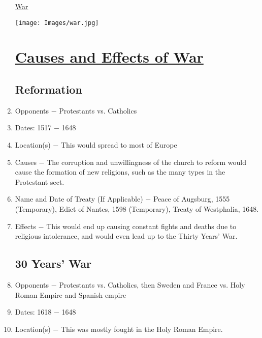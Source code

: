 \documentclass[12pt]{article}
\begin{document}
\begin{enumerate}
\newpage
\begin{center}
\end{center}
\begin{center}
\end{center}
\begin{center}
\underline{\Huge War}
\end{center}
\vspace{50pt}
\texttt{[image: Images/war.jpg]}
\newpage

\section{\underline{Causes and Effects of War}}

\subsection{Reformation} 

\item Opponents $-$ Protestants vs. Catholics

\item Dates: 1517 $-$ 1648

\item Location(s) $-$ This would spread to most of Europe

\item Causes $-$ The corruption and unwillingness of the church to reform would cause the formation of new religions, such as the many types in the Protestant sect.

\item Name and Date of Treaty (If Applicable) $-$ Peace of Augsburg, 1555 (Temporary), Edict of Nantes, 1598 (Temporary), Treaty of Westphalia, 1648.

\item Effects $-$ This would end up causing constant fights and deaths due to religious intolerance, and would even lead up to the Thirty Years' War.

\subsection{30 Years' War}

\item Opponents $-$ Protestants vs. Catholics, then Sweden and France vs. Holy Roman Empire and Spanish empire 

\item Dates: 1618 $-$ 1648

\item Location(s) $-$ This was mostly fought in the Holy Roman Empire.


\end{enumerate}
\end{document}
